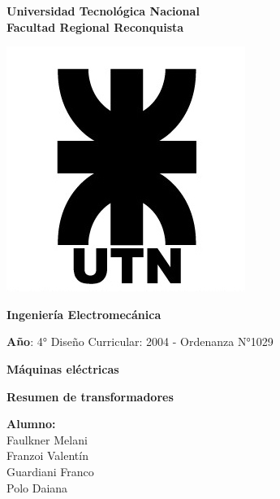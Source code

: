 \documentclass[a4paper, 11pt,titlepage]{article}
\begin{document}
	\pagestyle{fancy}
	\begin{titlepage}
		\begin{center}		
			{\huge \textbf{Universidad Tecnológica Nacional}}\\
			{\huge \textbf{Facultad Regional Reconquista}}
			
			\vspace{1cm}
			
			\includegraphics[width=0.40\linewidth]{UTNLOGO.jpg}\\
			
			\vspace{1cm}
			
			{\huge\textbf{Ingeniería Electromecánica}}
			
			\vspace{1cm}
			
			{\textbf{Año}: 4°} \hspace{5cm}  {Diseño Curricular: 2004 - Ordenanza N°1029 }
			
			\vspace{1cm}
			
			{{\LARGE  \textbf{Máquinas eléctricas}}}
			\vspace{1cm}
			
			{\LARGE \textbf{Resumen de transformadores}}
			
		\end{center}
		
		\begin{flushleft}
			\Large
			\textbf{Alumno:}\\
			\vspace{5mm}
			\hspace{3cm}Faulkner Melani\\
			\hspace{3cm}Franzoi Valentín\\
			\hspace{3cm}Guardiani Franco\\
			\hspace{3cm}Polo Daiana
		\end{flushleft}
	\end{titlepage}
	
\end{document}
